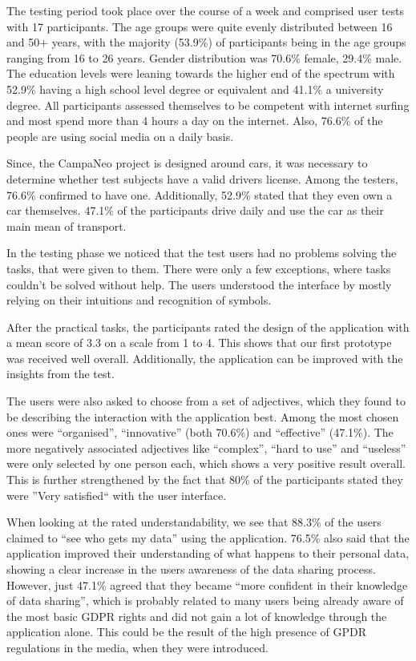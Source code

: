 \documentclass[../paper.tex]{subfiles}
\begin{document}
  The testing period took place over the course of a week and comprised
  user tests with 17 participants. The age groups were quite evenly
  distributed between 16 and 50+ years, with the majority (53.9\%) of
  participants being in the age groups ranging from 16 to 26 years.
  Gender distribution was 70.6\% female, 29.4\% male. The education levels
  were leaning towards the higher end of the spectrum with 52.9\% having a
  high school level degree or equivalent and 41.1\% a university degree.
  All participants assessed themselves to be competent with internet
  surfing and most spend more than 4 hours a day on the internet. Also,
  76.6\% of the people are using social media on a daily basis.

  Since, the CampaNeo project is designed around cars, it was necessary to
  determine whether test subjects have a valid drivers license. Among
  the testers, 76.6\% confirmed to have one. Additionally, 52.9\% stated
  that they even own a car themselves. 47.1\% of the participants drive daily
  and use the car as their main mean of transport.

  In the testing phase we noticed that the test users had no problems solving
  the tasks, that were given to them. There were only a few exceptions, where
  tasks couldn't be solved without help. The users understood the interface by
  mostly relying on their intuitions and recognition of symbols.

  After the practical tasks, the participants rated the design of the
  application with a mean score of 3.3 on a scale from 1 to 4. This shows
  that our first prototype was received well overall. Additionally, the
  application can be improved with the insights from the test.

  The users were also asked to choose from a set of adjectives, which they
  found to be describing the interaction with the application best. Among the
  most chosen ones were ``organised'', ``innovative'' (both 70.6\%) and
  ``effective'' (47.1\%). The more negatively associated adjectives like
  ``complex'', ``hard to use'' and ``useless'' were only selected by one person
  each, which shows a very positive result overall. This is further strengthened
  by the fact that 80\% of the participants stated they were ''Very satisfied``
  with the user interface.

  When looking at the rated understandability, we see that 88.3\% of the users
  claimed to ``see who gets my data'' using the application. 76.5\% also said
  that the application improved their understanding of what happens to their
  personal data, showing a clear increase in the users awareness of the data
  sharing process. However, just 47.1\% agreed that they became ``more confident
  in their knowledge of data sharing'', which is probably related to many users
  being already aware of the most basic GDPR rights and did not gain a lot of
  knowledge through the application alone. This could be the result of the high
  presence of GPDR regulations in the media, when they were introduced.
\end{document}
